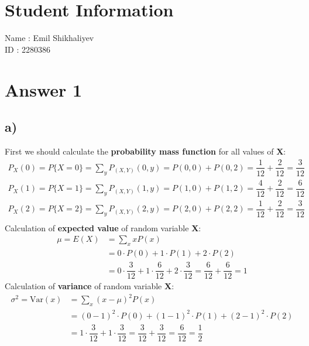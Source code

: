 \documentclass[12pt]{article}
\begin{document}
\section*{Student Information}

Name : Emil Shikhaliyev\\

ID : 2280386\\


\section*{Answer 1}
\subsection*{a)}
First we should calculate the \textbf{probability mass function} for all values of \textbf{X}:
\begin{equation}
    \begin{split}
        P_X (0) = P\{X = 0\} = \sum_{y} P_{(X, Y)} (0, y) = P(0, 0) + P(0, 2) = \dfrac{1}{12} + \dfrac{2}{12} = \dfrac{3}{12} \\
         P_X (1) = P\{X = 1\} = \sum_{y} P_{(X, Y)} (1, y) = P(1, 0) + P(1, 2) = \dfrac{4}{12} + \dfrac{2}{12} = \dfrac{6}{12} \\
         P_X (2) = P\{X = 2\} = \sum_{y} P_{(X, Y)} (2, y) = P(2, 0) + P(2, 2) = \dfrac{1}{12} + \dfrac{2}{12} = \dfrac{3}{12} \\
    \end{split}
\end{equation}
Calculation of \textbf{expected value} of random variable \textbf{X}:
\begin{equation}
    \begin{split}
        \mu = E(X) &= \sum_{x} xP(x) \\
        & = 0\cdot P(0) + 1 \cdot P(1) + 2 \cdot P(2) \\
        & = 0 \cdot \dfrac{3}{12} + 1 \cdot \dfrac{6}{12} + 2 \cdot \dfrac{3}{12} = \dfrac{6}{12} + \dfrac{6}{12} = 1
    \end{split}
\end{equation}
Calculation of \textbf{variance} of random variable \textbf{X}:
\begin{equation}
    \begin{split}
        \sigma^2 = \text{Var}(x) & = \sum_{x} (x-\mu)^{2} P(x) \\
        & = (0 - 1)^2 \cdot P(0) + (1-1)^2 \cdot P(1) + (2 - 1)^2 \cdot P(2) \\
        & = 1 \cdot \dfrac{3}{12} + 1 \cdot \dfrac{3}{12}  = \dfrac{3}{12} + \dfrac{3}{12} = \dfrac{6}{12} = \dfrac{1}{2}
    \end{split}
\end{equation}
\end{document}
